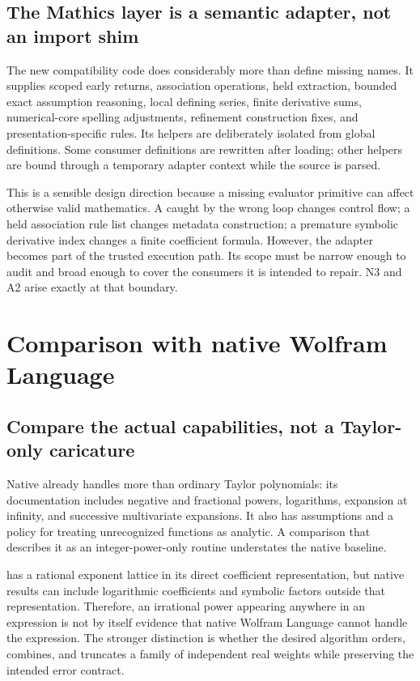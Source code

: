 \documentclass[11pt,letterpaper]{article}
\newcommand{\code}[1]{\texttt{\detokenize{#1}}}
\begin{document}
\subsection{The Mathics layer is a semantic adapter, not an import shim}

The new compatibility code does considerably more than define missing names. It supplies scoped early returns, association operations, held extraction, bounded exact assumption reasoning, local defining series, finite derivative sums, numerical-core spelling adjustments, refinement construction fixes, and presentation-specific rules. Its helpers are deliberately isolated from global \code{System} definitions. Some consumer definitions are rewritten after loading; other helpers are bound through a temporary adapter context while the source is parsed.~\cite{mcompat,mcalls,malgebra,mcalculus,mathicsguide}

This is a sensible design direction because a missing evaluator primitive can affect otherwise valid mathematics. A \code{Return} caught by the wrong loop changes control flow; a held association rule list changes metadata construction; a premature symbolic derivative index changes a finite coefficient formula. However, the adapter becomes part of the trusted execution path. Its scope must be narrow enough to audit and broad enough to cover the consumers it is intended to repair. N3 and A2 arise exactly at that boundary.

\section{Comparison with native Wolfram Language}
\label{sec:native}

\subsection{Compare the actual capabilities, not a Taylor-only caricature}

Native \code{Series} already handles more than ordinary Taylor polynomials: its documentation includes negative and fractional powers, logarithms, expansion at infinity, and successive multivariate expansions. It also has assumptions and a policy for treating unrecognized functions as analytic. A comparison that describes it as an integer-power-only routine understates the native baseline.~\cite{wlseries}

\code{SeriesData} has a rational exponent lattice in its direct coefficient representation, but native results can include logarithmic coefficients and symbolic factors outside that representation. Therefore, an irrational power appearing anywhere in an expression is not by itself evidence that native Wolfram Language cannot handle the expression. The stronger distinction is whether the desired algorithm orders, combines, and truncates a family of independent real weights while preserving the intended error contract.~\cite{wlseriesdata}
\end{document}
